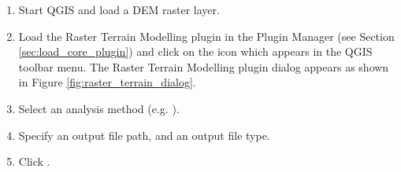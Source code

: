 \begin{enumerate}
  \item Start QGIS and load a DEM raster layer. 
  \item Load the Raster Terrain Modelling plugin in the Plugin Manager (see Section 
  \ref{sec:load_core_plugin}) and click on the  icon which appears in the QGIS toolbar menu. The Raster Terrain Modelling plugin dialog
appears as shown in Figure \ref{fig:raster_terrain_dialog}.
  \item Select an analysis method (e.g. ).
  \item Specify an output file
path, and an output file type.
  \item Click .
\end{enumerate}

\newpage



